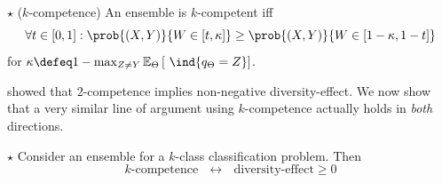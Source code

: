 \documentclass[../main.tex]{subfiles}
\begin{document}
\begin{definition} $\star$ ($k$-competence)
   \label{def:k-competence} 
    An ensemble is $k$-competent iff
$$
\forall t \in [0,1]:
\prob{(X,Y) }{W \in \left[ t, \kappa \right]}
\geq \prob{(X,Y) }{W \in \left[ 1-\kappa, 1-t \right]}
$$
for $ \kappa \defeq 1 - \max_{Z \not= Y} \mathbb{E}_{\Theta}\left[ ~\ind{q_{\Theta} = Z} \right]$.
\end{definition}


\citeauthor{theisen_WhenAreEnsembles_2023} showed that $2$-competence implies non-negative diversity-effect. 
We now show that a very similar line of argument using $k$-competence actually holds in \textit{both} directions.

\begin{theorem} $\star$ Consider an ensemble for a $k$-class classification problem. Then
$$
\text{$k$-competence}  ~ ~ ~\leftrightarrow~ ~ ~  \text{diversity-effect} \geq 0
$$
\label{thm:k-competence-diversity-effect}
\end{theorem}
\end{document}
